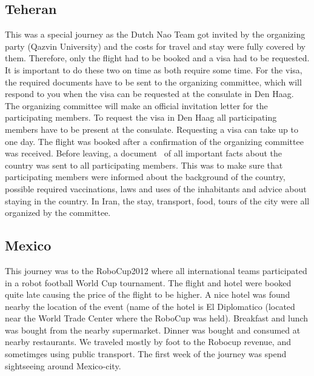 \documentclass[11pt,a4paper,oneside]{article}
\begin{document}
\subsection{Teheran}
This was a special journey as the Dutch Nao Team got invited by the organizing party (Qazvin University) and the costs for travel and stay were fully covered by them. Therefore, only the flight had to be booked and a visa had to be requested. It is important to do these two on time as both require some time. For the visa, the required documents have to be sent to the organizing committee, which will respond to you when the visa can be requested at the consulate in Den Haag. The organizing committee will make an official invitation letter for the participating members. To request the visa in Den Haag all participating members have to be present at the consulate. Requesting a visa can take up to one day. The flight was booked after a confirmation of the organizing committee was received. Before leaving, a document~\cite{Verschoor2012Iran} of all important facts about the country was sent to all participating members. This was to make sure that participating members were informed about the background of the country, possible required vaccinations, laws and uses of the inhabitants and advice about staying in the country. In Iran, the stay, transport, food, tours of the city were all organized by the committee. 

\subsection{Mexico}
This journey was to the RoboCup2012 where all international teams participated in a robot football World Cup tournament. The flight and hotel were booked quite late causing the price of the flight to be higher. A nice hotel was found nearby the location of the event (name of the hotel is El Diplomatico (located near the World Trade Center where the RoboCup was held). Breakfast and lunch was bought from the nearby supermarket. Dinner was bought and consumed at nearby restaurants. We traveled mostly by foot to the Robocup revenue, and sometimges using public transport. The first week of the journey was spend sightseeing around Mexico-city.
\end{document}

